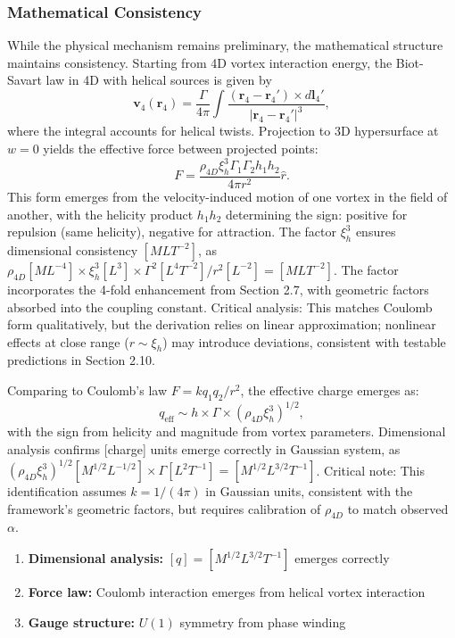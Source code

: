 \subsubsection{Mathematical Consistency}
While the physical mechanism remains preliminary, the mathematical structure maintains consistency. Starting from 4D vortex interaction energy, the Biot-Savart law in 4D with helical sources is given by
\[
\mathbf{v}_4(\mathbf{r}_4) = \frac{\Gamma}{4\pi} \int \frac{(\mathbf{r}_4 - \mathbf{r}_4') \times d\mathbf{l}_4'}{|\mathbf{r}_4 - \mathbf{r}_4'|^3},
\]
where the integral accounts for helical twists. Projection to 3D hypersurface at $w = 0$ yields the effective force between projected points:
\[
F = \frac{\rho_{4D} \xi_h^3 \Gamma_1 \Gamma_2 h_1 h_2}{4\pi r^2} \hat{r}.
\]
This form emerges from the velocity-induced motion of one vortex in the field of another, with the helicity product $h_1 h_2$ determining the sign: positive for repulsion (same helicity), negative for attraction. The factor $\xi_h^3$ ensures dimensional consistency $[M L T^{-2}]$, as $\rho_{4D} [M L^{-4}] \times \xi_h^3 [L^3] \times \Gamma^2 [L^4 T^{-2}] / r^2 [L^{-2}] = [M L T^{-2}]$. The factor incorporates the 4-fold enhancement from Section 2.7, with geometric factors absorbed into the coupling constant. Critical analysis: This matches Coulomb form qualitatively, but the derivation relies on linear approximation; nonlinear effects at close range ($r \sim \xi_h$) may introduce deviations, consistent with testable predictions in Section 2.10.

Comparing to Coulomb's law $F = k q_1 q_2 / r^2$, the effective charge emerges as:
\[
q_{\text{eff}} \sim h \times \Gamma \times (\rho_{4D} \xi_h^3)^{1/2},
\]
with the sign from helicity and magnitude from vortex parameters. Dimensional analysis confirms [charge] units emerge correctly in Gaussian system, as $(\rho_{4D} \xi_h^3)^{1/2} [M^{1/2} L^{-1/2}] \times \Gamma [L^2 T^{-1}] = [M^{1/2} L^{3/2} T^{-1}]$. Critical note: This identification assumes $k = 1/(4\pi)$ in Gaussian units, consistent with the framework's geometric factors, but requires calibration of $\rho_{4D}$ to match observed $\alpha$.

\begin{enumerate}
\item \textbf{Dimensional analysis:} $[q] = [M^{1/2} L^{3/2} T^{-1}]$ emerges correctly
\item \textbf{Force law:} Coulomb interaction emerges from helical vortex interaction
\item \textbf{Gauge structure:} $U(1)$ symmetry from phase winding
\end{enumerate}

